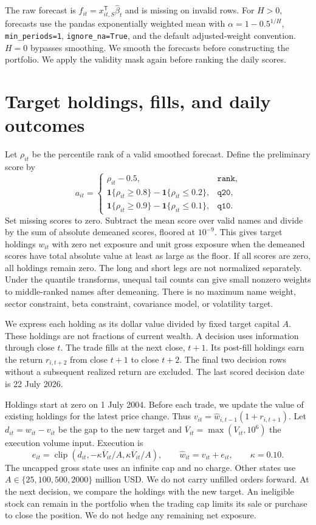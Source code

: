 \documentclass[10pt,letterpaper]{article}
\newcommand{\ind}{\mathbf 1}
\begin{document}
The raw forecast is $f_{it}=x_{it,S}^{\mathsf T}\widehat\beta_t$ and is missing on invalid rows. For $H>0$, forecasts use the pandas exponentially weighted mean with $\alpha=1-0.5^{1/H}$, \texttt{min\_periods=1}, \texttt{ignore\_na=True}, and the default adjusted-weight convention. $H=0$ bypasses smoothing. We smooth the forecasts before constructing the portfolio. We apply the validity mask again before ranking the daily scores.

\section{Target holdings, fills, and daily outcomes}\label{sec:execution}
Let $\rho_{it}$ be the percentile rank of a valid smoothed forecast. Define the preliminary score by
\[
 a_{it}=\begin{cases}
 \rho_{it}-0.5,&\texttt{rank},\\
 \ind\{\rho_{it}\geq0.8\}-\ind\{\rho_{it}\leq0.2\},&\texttt{q20},\\
 \ind\{\rho_{it}\geq0.9\}-\ind\{\rho_{it}\leq0.1\},&\texttt{q10}.
 \end{cases}
\]
Set missing scores to zero. Subtract the mean score over valid names and divide by the sum of absolute demeaned scores, floored at $10^{-9}$. This gives target holdings $w_{it}$ with zero net exposure and unit gross exposure when the demeaned scores have total absolute value at least as large as the floor. If all scores are zero, all holdings remain zero. The long and short legs are not normalized separately. Under the quantile transforms, unequal tail counts can give small nonzero weights to middle-ranked names after demeaning. There is no maximum name weight, sector constraint, beta constraint, covariance model, or volatility target.

We express each holding as its dollar value divided by fixed target capital $A$. These holdings are not fractions of current wealth. A decision uses information through close $t$. The trade fills at the next close, $t+1$. Its post-fill holdings earn the return $r_{i,t+2}$ from close $t+1$ to close $t+2$. The final two decision rows without a subsequent realized return are excluded. The last scored decision date is 22 July 2026.

Holdings start at zero on 1 July 2004. Before each trade, we update the value of existing holdings for the latest price change. Thus $v_{it}=\widehat w_{i,t-1}(1+r_{i,t+1})$. Let $d_{it}=w_{it}-v_{it}$ be the gap to the new target and $\overline V_{it}=\max(V_{it},10^6)$ the execution volume input. Execution is
\[
 e_{it}=\operatorname{clip}\left(d_{it},-\kappa \overline V_{it}/A,\kappa \overline V_{it}/A\right),
 \qquad \widehat w_{it}=v_{it}+e_{it},\qquad \kappa=0.10.
\]
The uncapped gross state uses an infinite cap and no charge. Other states use $A\in\{25,100,500,2000\}$ million USD. We do not carry unfilled orders forward. At the next decision, we compare the holdings with the new target. An ineligible stock can remain in the portfolio when the trading cap limits its sale or purchase to close the position. We do not hedge any remaining net exposure.
\end{document}
